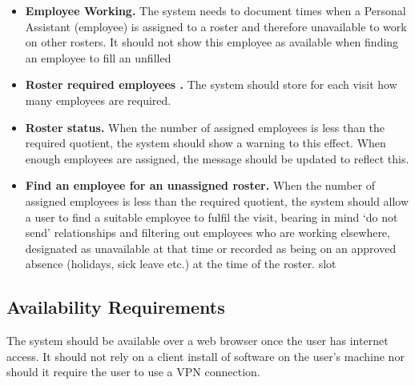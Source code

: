 \documentclass[a4paper,Times New Roman 11pt]{article}
\begin{document}
\begin{samepage}
\begin{itemize}
\item \textbf{Employee Working.} The system needs to document times when a  Personal Assistant (employee) is assigned to a roster and therefore unavailable to work on other rosters. It should not show this employee as available when finding an employee to fill an unfilled 
\item \textbf{Roster required employees .} The system should store for each visit how many employees are required.
\item \textbf{Roster status.} When the number of assigned employees is less than the required quotient, the system should show a warning to this effect. When enough employees are assigned, the message should be updated to reflect this.
\item \textbf{Find an employee for an unassigned roster.} When the number of assigned employees is less than the required quotient, the system should allow a user to find a suitable employee to fulfil the visit, bearing in mind `do not send' relationships and filtering out employees who are working elsewhere, designated as unavailable at that time or recorded as being on an approved absence (holidays, sick leave etc.) at the time of the roster.
slot 
\end{itemize}
\subsection {Availability Requirements }

The system should be available over a web browser once the user has internet access. It should not rely on a client install of software on the user's machine nor should it require the user to use a VPN connection. 


\end{samepage}
\end{document}

